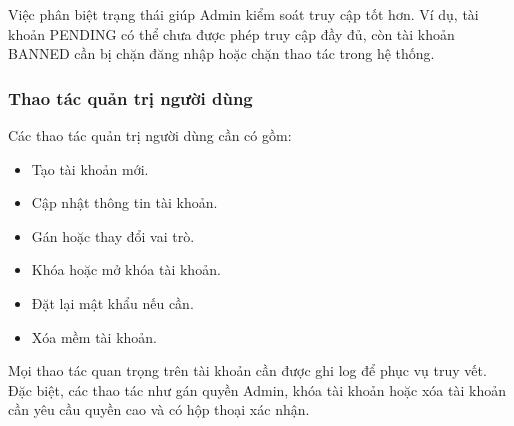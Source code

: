 Việc phân biệt trạng thái giúp Admin kiểm soát truy cập tốt hơn. Ví dụ, tài khoản PENDING có thể chưa được phép truy cập đầy đủ, còn tài khoản BANNED cần bị chặn đăng nhập hoặc chặn thao tác trong hệ thống.

\subsubsection{Thao tác quản trị người dùng}

Các thao tác quản trị người dùng cần có gồm:

\begin{itemize}
    \item Tạo tài khoản mới.
    \item Cập nhật thông tin tài khoản.
    \item Gán hoặc thay đổi vai trò.
    \item Khóa hoặc mở khóa tài khoản.
    \item Đặt lại mật khẩu nếu cần.
    \item Xóa mềm tài khoản.
\end{itemize}

Mọi thao tác quan trọng trên tài khoản cần được ghi log để phục vụ truy vết. Đặc biệt, các thao tác như gán quyền Admin, khóa tài khoản hoặc xóa tài khoản cần yêu cầu quyền cao và có hộp thoại xác nhận.
